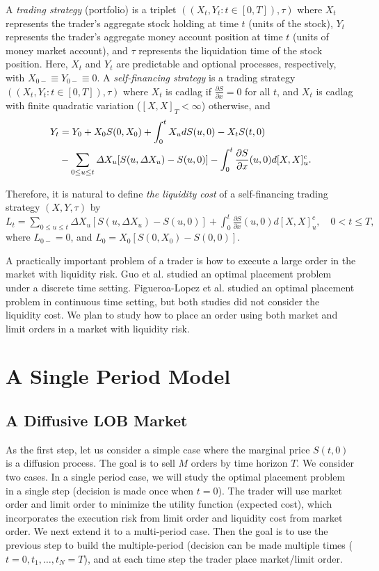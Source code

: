 \documentclass[11pt]{article}
\theoremstyle{plain}
\numberwithin{equation}{section}
\begin{document}
A \emph{trading strategy} (portfolio) is a triplet $((X_t,Y_t : t \in [0,T]),\tau)$ where $X_t$ represents the trader's aggregate stock holding at time $t$
(units of the stock), $Y_t$ represents the trader's aggregate money account position at time $t$ (units of money market account), and $\tau$
represents the liquidation time of the stock position. Here, $X_t$ and $Y_t$ are predictable and optional processes, respectively,
with $X_{0-} \equiv Y_{0-} \equiv 0$.  A \emph{self-financing strategy} is a trading strategy $((X_t,Y_t : t \in [0,T]),\tau)$ where
 $X_t$ is cadlag if $\frac{\partial S}{\partial x}=0$ for all $t$, and $X_t$ is cadlag with finite quadratic variation
       ($[X,X]_T < \infty$) otherwise, and
\begin{align}
 Y_t &= Y_0 + X_0 S(0,X_0) + \int_0^t X_u dS(u,0)-X_t S(t,0) \notag \\
     &- \sum_{0\leq u \leq t} \Delta X_u [S(u, \Delta X_u)-S(u,0)] - \int_0^t \frac{\partial S}{\partial x}(u,0) d[X,X]_u^c. \label{SF}
\end{align}

Therefore, it is natural to define \emph{the liquidity cost} of a self-financing trading strategy $(X, Y, \tau)$ by
$L_t = \sum_{0\leq u \leq t} \Delta X_u [S(u, \Delta X_u)-S(u,0)] + \int_0^t \frac{\partial S}{\partial x}(u,0) d[X,X]_u^c, \quad 0<t \leq T,$
where $L_{0-} = 0$, and $L_0 = X_0[S(0,X_0)-S(0,0)]$. 

A practically important problem of a trader is how to execute a large order in the market with liquidity risk. Guo et al. \cite{GDR:2017} studied an optimal placement problem under a discrete time setting. Figueroa-Lopez et al. \cite{FLP:2018} studied an optimal placement problem in continuous time setting, but both studies did not consider the liquidity cost. We plan to study how to place an order using both market and limit orders in a market with liquidity risk.

\section{A Single Period Model}

\subsection{A Diffusive LOB Market}

As the first step, let us consider a simple case where the marginal price $S(t,0)$ is a diffusion process. The goal is to sell $M$ orders by time horizon $T$. We consider two cases. In a single period case, we will study the optimal placement problem in a single step (decision is made once when $t=0$). The trader will use market order and limit order to minimize the utility function (expected cost), which incorporates the execution risk from limit order and liquidity cost from market order. We next extend it to a multi-period case. Then the goal is to use the previous step to build the multiple-period (decision can be made multiple times ($t=0,t_1,\dots,t_N=T$), and at each time step the trader place market/limit order.
\end{document}
